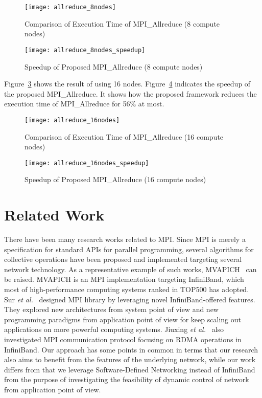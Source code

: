 \begin{figure}
    \centering
    \texttt{[image: allreduce\_8nodes]}
    \caption{Comparison of Execution Time of MPI\_Allreduce (8 compute nodes)}%
    \label{fig:evaluation-8nodes}
\end{figure}

\begin{figure}
    \centering
    \texttt{[image: allreduce\_8nodes\_speedup]}
    \caption{Speedup of Proposed MPI\_Allreduce (8 compute nodes)}%
    \label{fig:evaluation-8nodes-normalized}
\end{figure}

Figure~\ref{fig:evaluation-16nodes} shows the result of using 16 nodes.
Figure~\ref{fig:evaluation-16nodes-normalized} indicates the speedup of the
proposed MPI\_Allreduce. It shows how the proposed framework reduces the
execution time of MPI\_Allreduce for 56\% at most.

\begin{figure}
    \centering
    \texttt{[image: allreduce\_16nodes]}
    \caption{Comparison of Execution Time of MPI\_Allreduce (16 compute nodes)}%
    \label{fig:evaluation-16nodes}
\end{figure}

\begin{figure}
    \centering
    \texttt{[image: allreduce\_16nodes\_speedup]}
    \caption{Speedup of Proposed MPI\_Allreduce (16 compute nodes)}%
    \label{fig:evaluation-16nodes-normalized}
\end{figure}

\section{Related Work}\label{sec:iii-related-work}

There have been many research works related to MPI\@. Since MPI is merely a
specification for standard APIs for parallel programming, several algorithms
for collective operations have been proposed and implemented targeting several
network technology. As a representative example of such works,
MVAPICH~\autocite{mvapich} can be raised. MVAPICH is an MPI implementation
targeting InfiniBand, which most of high-performance computing systems ranked
in TOP500 has adopted. Sur \emph{et al.}~\autocite{Sur2011} designed MPI
library by leveraging novel InfiniBand-offered features.
They explored new architectures from system point of view and new programming
paradigms from application point of view for keep scaling out applications on
more powerful computing systems. Jiuxing \emph{et al.}~\autocite{Jiuxing2004}
also investigated MPI communication protocol focusing on RDMA operations in
InfiniBand. Our approach has some points in common in terms that our research
also aims to benefit from the features of the underlying network, while our
work differs from that we leverage Software-Defined Networking instead of
InfiniBand from the purpose of investigating the feasibility of dynamic
control of network from application point of view.

